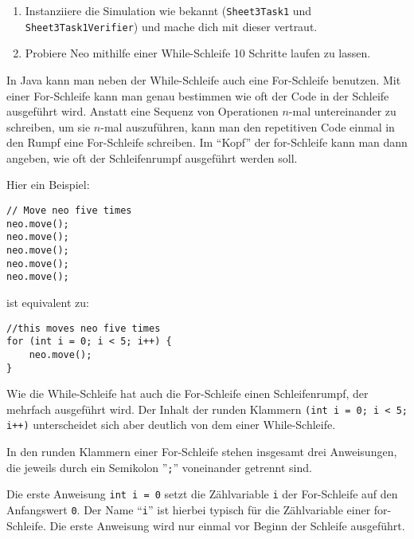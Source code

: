 
\begin{enumerate}
	\item Instanziiere die Simulation wie bekannt (\lstinline{Sheet3Task1} und \lstinline{Sheet3Task1Verifier}) und mache dich mit dieser vertraut.
	\item Probiere Neo mithilfe einer While-Schleife 10 Schritte laufen zu lassen.\\

\end{enumerate}


\begin{Infobox}
	In Java kann man neben der While-Schleife auch eine For-Schleife benutzen.
	Mit einer For-Schleife kann man genau bestimmen wie oft der Code in der Schleife ausgeführt wird.
	Anstatt eine Sequenz von Operationen $n$-mal untereinander zu schreiben, um sie $n$-mal auszuführen, kann man den repetitiven Code einmal in den Rumpf eine For-Schleife schreiben.
	Im \enquote{Kopf} der for-Schleife kann man dann angeben, wie oft der Schleifenrumpf ausgeführt werden soll.

	Hier ein Beispiel:

	\begin{lstlisting}[numbers=none]
// Move neo five times
neo.move();
neo.move();
neo.move();
neo.move();
neo.move();
	\end{lstlisting}

	ist equivalent zu:

	\begin{lstlisting}[numbers=none]
//this moves neo five times
for (int i = 0; i < 5; i++) {
	neo.move();
}
	\end{lstlisting}

	Wie die While-Schleife hat auch die For-Schleife einen Schleifenrumpf, der mehrfach ausgeführt wird.
	Der Inhalt der runden Klammern \lstinline{(int i = 0; i < 5; i++)} unterscheidet sich aber deutlich von dem einer While-Schleife.

	In den runden Klammern einer For-Schleife stehen insgesamt drei Anweisungen, die jeweils durch ein Semikolon ''\lstinline{;}'' voneinander getrennt sind.

	Die erste Anweisung \lstinline{int i = 0} setzt die Zählvariable \lstinline{i} der For-Schleife auf den Anfangswert \lstinline{0}.
	Der Name \enquote{\lstinline{i}} ist hierbei typisch für die Zählvariable einer for-Schleife.
	Die erste Anweisung wird nur einmal vor Beginn der Schleife ausgeführt.


\end{Infobox}
